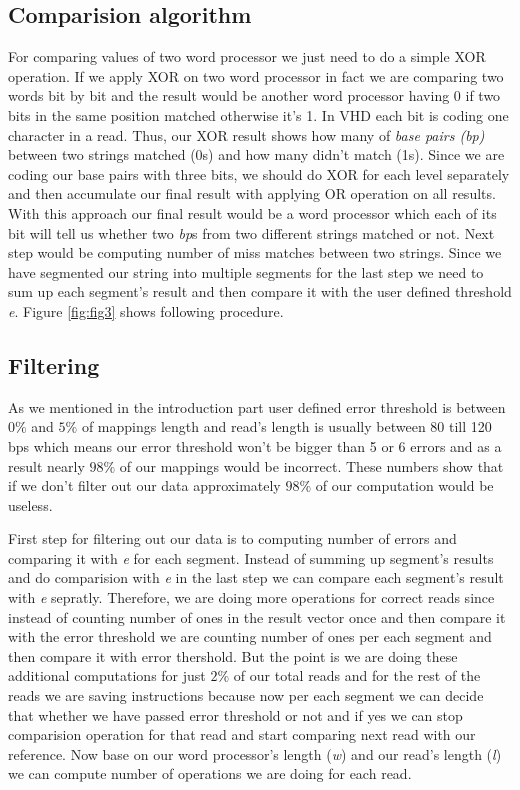 \subsection{Comparision algorithm}
For comparing values of two word processor we just need to do a simple XOR operation. If we apply XOR on two word processor in fact we are comparing two words bit by bit and the result would be another word processor having 0 if two bits in the same position matched otherwise it's 1. In VHD each bit is coding one character in a read. Thus, our XOR result shows how many of \emph{base pairs (bp)} between two strings matched (0s) and how many didn't match (1s).
Since we are coding our base pairs with three bits, we should do XOR for each level separately and then accumulate our final result with applying OR operation  on all results. With this approach our final result would be a word processor which each of its bit will tell us whether two \textit{bp}s from two different strings matched or not. Next step would be computing number of miss matches between two strings. Since we have segmented our string into multiple segments for the last step we need to sum up each segment's result and then compare it with the user defined threshold \textit{e}. Figure \ref{fig:fig3} shows following procedure.
  
\subsection{Filtering}
As we mentioned in the introduction part user defined error threshold is between $0\%$ and $5\%$ of mappings length and read's length is usually between 80 till 120 bps which means our error threshold won't be bigger than 5 or 6 errors and as a result nearly $98\%$ of our mappings would be incorrect. These numbers show that if we don't filter out our data approximately $98\%$ of our computation would be useless. 

First step for filtering out our data is to computing number of errors and comparing it with \emph{e} for each segment. Instead of summing up segment's results and do comparision with \emph{e} in the last step we can compare each segment's result with \emph{e} sepratly. Therefore, we are doing more operations for correct reads since instead of counting number of ones in the result vector once and then compare it with the error threshold we are counting number of ones per each segment and then compare it with error thershold.  But the point is we are doing these additional computations for just $2\%$ of our total reads and for the rest of the reads we are saving instructions because now per each segment we can decide that whether we have passed error threshold or not and if yes we can stop comparision operation for that read and start comparing next read with our reference. Now base on our word processor's length (\emph{w}) and our read's length (\emph{l}) we can compute number of operations we are doing for each read.

